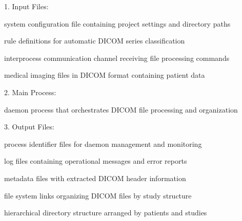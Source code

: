 \documentclass[letterpaper,10pt,english]{sphinxmanual}
\begin{document}

\sphinxAtStartPar
{}

\begin{DUlineblock}{0em}
\item[] 1. Input Files:
\end{DUlineblock}

\begin{DUlineblock}{0em}
\item[] \sphinxhyphen{}  \sphinxhyphen{} system configuration file containing project settings and directory paths
\item[] \sphinxhyphen{}  \sphinxhyphen{} rule definitions for automatic DICOM series classification
\item[] \sphinxhyphen{}  \sphinxhyphen{} inter\sphinxhyphen{}process communication channel receiving file processing commands
\item[] \sphinxhyphen{}  \sphinxhyphen{} medical imaging files in DICOM format containing patient data
\end{DUlineblock}

\begin{DUlineblock}{0em}
\item[] 2. Main Process:
\end{DUlineblock}

\begin{DUlineblock}{0em}
\item[] \sphinxhyphen{}  \sphinxhyphen{} daemon process that orchestrates DICOM file processing and organization
\end{DUlineblock}

\begin{DUlineblock}{0em}
\item[] 3. Output Files:
\end{DUlineblock}

\begin{DUlineblock}{0em}
\item[] \sphinxhyphen{}  \sphinxhyphen{} process identifier files for daemon management and monitoring
\item[] \sphinxhyphen{}  \sphinxhyphen{} log files containing operational messages and error reports
\item[] \sphinxhyphen{}  \sphinxhyphen{} metadata files with extracted DICOM header information
\item[] \sphinxhyphen{}  \sphinxhyphen{} file system links organizing DICOM files by study structure
\item[] \sphinxhyphen{}  \sphinxhyphen{} hierarchical directory structure arranged by patients and studies
\end{DUlineblock}
\end{document}
